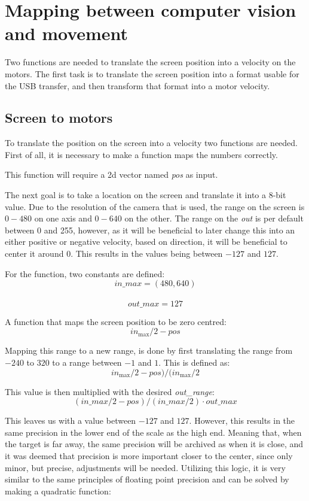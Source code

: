 \section{Mapping between computer vision and movement}
Two functions are needed to translate the screen position into a velocity on the motors.
The first task is to translate the screen position into a format usable for the USB transfer, and then transform that format into a motor velocity.

\subsection{Screen to motors}
To translate the position on the screen into a velocity two functions are needed.
First of all, it is necessary to make a function maps the numbers correctly. 

This function will require a 2d vector named \textit{pos} as input. 

The next goal is to take a location on the screen and translate it into a 8-bit value.  
Due to the resolution of the camera that is used, the range on the screen is $0 - 480$ on one axis and $0 - 640$ on the other.
The range on the \textit{out}  is per default between 0 and 255, however, as it will be beneficial to later change this into an either positive or negative velocity, based on direction, it will be beneficial to center it around 0.
This results in the values being between $-127$ and $127$.

For the function, two constants are defined: \\
$$in\_max = (480,640)$$\\
$$out\_max = 127$$

A function that maps the screen position to be zero centred: 
$$
in_\text{max}/2 - pos
$$

Mapping this range to a new range, is done by first translating the range from $-240$ to $320$ to a range between $-1$ and $1$.
This is defined as:
$$
in_\text{max}/2 - pos)/(in_\text{max}/2
$$


This value is then multiplied with the desired \textit{out\_range}:
$$
(in\_max/2 - pos)/(in\_max/2) \cdot out\_max
$$

This leaves us with a value between $-127$ and $127$. 
However, this results in the same precision in the lower end of the scale as the high end.
Meaning that, when the target is far away, the same precision will be archived as when it is close, and it was deemed that precision is more important closer to the center, since only minor, but precise, adjustments will be needed.
Utilizing this logic, it is very similar to the same principles of floating point precision and can be solved by making a quadratic function:

